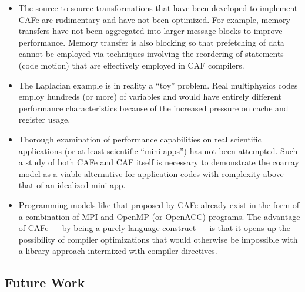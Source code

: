 \begin{itemize}
\item
  The source-to-source transformations that have been developed to implement CAFe
  are rudimentary and have not been optimized.  For example, memory transfers have
  not been aggregated into larger message blocks to improve performance.  Memory transfer
  is also blocking so that prefetching of data cannot be employed via techniques
  involving the reordering of statements (code motion) that are effectively employed in
  CAF compilers.
\item
  The Laplacian example is in reality a ``toy'' problem.  Real multiphysics codes
  employ hundreds (or more) of variables and would have entirely different performance
  characteristics because of the increased pressure on cache and register usage.
\item
  Thorough examination of performance capabilities on real scientific applications
  (or at least scientific ``mini-apps'') has not been attempted.  Such a study of both
  CAFe and CAF itself is necessary to demonstrate the coarray model as a viable alternative
  for application codes with complexity above that of an idealized mini-app.
\item
  Programming models like that proposed by CAFe already exist in the form of a combination
  of MPI and OpenMP (or OpenACC) programs.  The advantage of CAFe --- by being a purely
  language construct --- is that it opens up the possibility of compiler optimizations
  that would otherwise be impossible with a library approach intermixed with compiler directives.
\end{itemize}

\subsection{Future Work}


